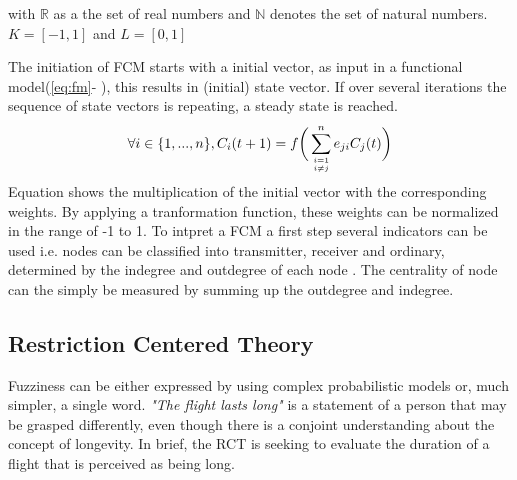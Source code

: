 \documentclass[conference]{IEEEtran}
\begin{document}
with \begin{math} \mathbb{R} \end{math} as a the set of real numbers and \begin{math} \mathbb{N} \end{math} denotes the set of natural numbers. \begin{math} K = [-1,1] \end{math} and \begin{math} L = [0,1] \end{math} \cite{stach2005}

The initiation of FCM starts with a initial vector, as input in a functional model(\ref{eq:fm}- \cite{stach2005}), this results in (initial) state vector. If over several iterations the sequence of state vectors is repeating, a steady state is reached.  
\begin{equation}\label{eq:fm}
\forall i \in \{1,...,n\},C_{i}(t+1) = f  \bigg(\sum_{i=1 \atop i \neq j}^{n} e_{ji}C_{j}(t)\bigg)
\end{equation}
Equation shows the multiplication of the initial vector with the corresponding weights. By applying a tranformation function, these weights can be normalized in the range of -1 to 1. To intpret a FCM a first step several indicators can be used i.e. nodes can be classified into transmitter, receiver and ordinary, determined by the indegree and outdegree of each node \cite{ozesmi2004}. The centrality of node can the simply be measured by summing up the outdegree and indegree.


\subsection{Restriction Centered Theory}
Fuzziness can be either expressed by using complex probabilistic models or, much simpler, a single word. \emph{"The flight lasts long"} is a statement of a person that may be grasped differently, even though there is a conjoint understanding about the concept of longevity. In brief, the RCT is seeking to evaluate the duration of a flight that is perceived as being long.
\end{document}
